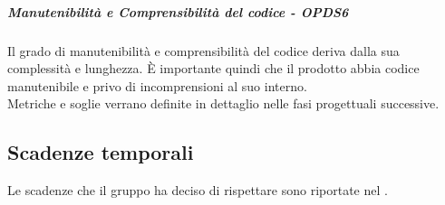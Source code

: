 \documentclass[PianoDiQualifica.tex]{subfiles}
\begin{document}
				\subparagraph{Manutenibilità e Comprensibilità del codice - OPDS6}
				Il grado di manutenibilità e comprensibilità del codice deriva dalla sua complessità e lunghezza. È importante quindi che il prodotto abbia codice manutenibile e
				privo di incomprensioni al suo interno. \\
				Metriche e soglie verrano definite in dettaglio nelle fasi progettuali successive.
				
		\subsection{Scadenze temporali}
		Le scadenze che il gruppo \GRUPPO{} ha deciso di rispettare sono riportate nel \PPdocRR{}.
				
\end{document}

